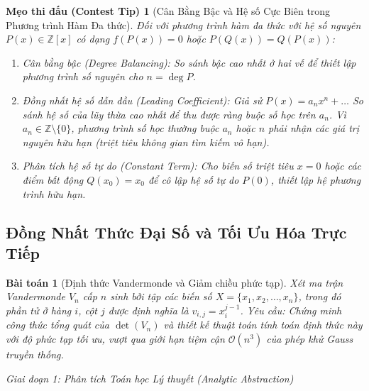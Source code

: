 \documentclass{article}
\newtheorem{baitoan}{Bài toán}
\newtheorem{tip}{Mẹo thi đấu (Contest Tip)}
\begin{document}
\begin{tip}[Cân Bằng Bậc và Hệ số Cực Biên trong Phương trình Hàm Đa thức]
Đối với phương trình hàm đa thức với hệ số nguyên $P(x) \in \mathbb{Z}[x]$ có dạng $f(P(x)) = 0$ hoặc $P(Q(x)) = Q(P(x))$:
\begin{enumerate}
    \item \emph{Cân bằng bậc (Degree Balancing):} So sánh bậc cao nhất ở hai vế để thiết lập phương trình số nguyên cho $n = \deg P$.
    \item \emph{Đồng nhất hệ số dẫn đầu (Leading Coefficient):} Giả sử $P(x) = a_n x^n + \dots$ So sánh hệ số của lũy thừa cao nhất để thu được ràng buộc số học trên $a_n$. Vì $a_n \in \mathbb{Z} \setminus \{0\}$, phương trình số học thường buộc $a_n$ hoặc $n$ phải nhận các giá trị nguyên hữu hạn (triệt tiêu không gian tìm kiếm vô hạn).
    \item \emph{Phân tích hệ số tự do (Constant Term):} Cho biến số triệt tiêu $x = 0$ hoặc các điểm bất động $Q(x_0) = x_0$ để cô lập hệ số tự do $P(0)$, thiết lập hệ phương trình hữu hạn.
\end{enumerate}
\end{tip}

\subsection{Đồng Nhất Thức Đại Số và Tối Ưu Hóa Trực Tiếp}

\begin{baitoan}[Định thức Vandermonde và Giảm chiều phức tạp]
Xét ma trận Vandermonde $V_n$ cấp $n$ sinh bởi tập các biến số $X = \{x_1, x_2, \dots, x_n\}$, trong đó phần tử ở hàng $i$, cột $j$ được định nghĩa là $v_{i,j} = x_i^{j-1}$. Yêu cầu: Chứng minh công thức tổng quát của $\det(V_n)$ và thiết kế thuật toán tính toán định thức này với độ phức tạp tối ưu, vượt qua giới hạn tiệm cận $\mathcal{O}(n^3)$ của phép khử Gauss truyền thống.
\end{baitoan}

\vspace{0.5em}\noindent\emph{Giai đoạn 1: Phân tích Toán học Lý thuyết (Analytic Abstraction)}
\end{document}
